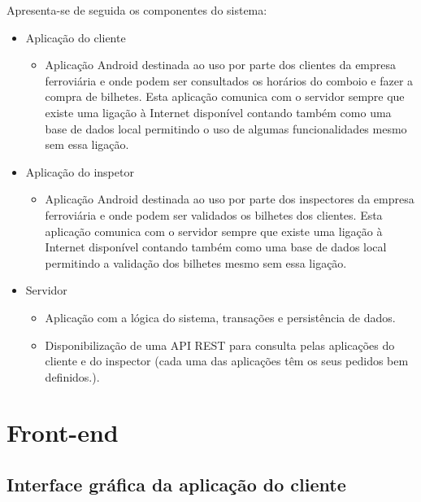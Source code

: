 \documentclass[12pt]{article}
\begin{document}
\newpage

Apresenta-se de seguida os componentes do sistema:
\begin{itemize}
\item Aplicação do cliente
\begin{itemize}
\item Aplicação Android destinada ao uso por parte dos clientes da empresa ferroviária e onde podem ser consultados os horários do comboio e fazer a compra de bilhetes. Esta aplicação comunica com o servidor sempre que existe uma ligação à Internet disponível contando também como uma base de dados local permitindo o uso de algumas funcionalidades mesmo sem essa ligação.
\end{itemize}
\item Aplicação do inspetor
\begin{itemize}
\item Aplicação Android destinada ao uso por parte dos inspectores da empresa ferroviária e onde podem ser validados os bilhetes dos clientes. Esta aplicação comunica com o servidor sempre que existe uma ligação à Internet disponível contando também como uma base de dados local permitindo a validação dos bilhetes mesmo sem essa ligação.
\end{itemize}
\item Servidor
\begin{itemize}
\item Aplicação com a lógica do sistema, transações e persistência de dados.
\item Disponibilização de uma API REST para consulta pelas aplicações do cliente e do inspector (cada uma das aplicações têm os seus pedidos bem definidos.).
\end{itemize}
\end{itemize}


\section{Front-end}

\subsection{Interface gráfica da aplicação do cliente}
\end{document}
